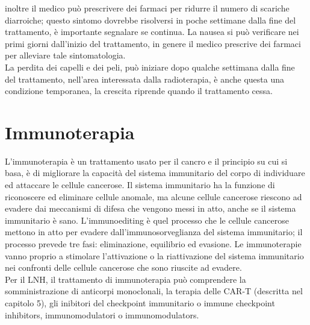 inoltre il medico può prescrivere dei farmaci per ridurre il numero di scariche diarroiche; questo sintomo dovrebbe 
risolversi in poche settimane dalla fine del trattamento, è importante segnalare se continua. La nausea si può 
verificare nei primi giorni dall’inizio del trattamento, in genere il medico prescrive dei farmaci per alleviare 
tale sintomatologia.\\ 
La perdita dei capelli e dei peli, può iniziare dopo qualche settimana dalla fine del trattamento, nell’area 
interessata dalla radioterapia, è anche questa una condizione temporanea, la crescita riprende quando il trattamento 
cessa\cite{UKRADIOTP}.\\ 

\section{Immunoterapia}
L’immunoterapia è un trattamento usato per il cancro e il principio su cui si basa, è di migliorare la capacità 
del sistema immunitario del corpo di individuare ed attaccare le cellule cancerose. 
Il sistema immunitario ha la funzione di riconoscere ed eliminare cellule anomale, ma alcune cellule cancerose 
riescono ad evadere dai meccanismi di difesa che vengono messi in atto, anche se il sistema immunitario è sano. 
L’immunoediting è quel processo che le cellule cancerose mettono in atto per evadere dall’immunosorveglianza del 
sistema immunitario; il processo prevede tre fasi: eliminazione, equilibrio ed evasione. Le immunoterapie vanno 
proprio a stimolare l’attivazione o la riattivazione del sistema immunitario nei confronti delle cellule cancerose 
che sono riuscite ad evadere\cite{IMMUNOTP}.\\
Per il LNH, il trattamento di immunoterapia può comprendere la somministrazione di anticorpi monoclonali, 
la terapia delle CAR-T (descritta nel capitolo 5), 
gli inibitori del checkpoint immunitario o immune checkpoint inhibitors, 
immunomodulatori o immunomodulators.\\

